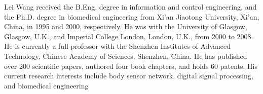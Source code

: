 \documentclass[journal]{IEEEtran}
\begin{document}
\begin{IEEEbiography}{Lei Wang}
received the B.Eng. degree in information and control engineering, and the Ph.D. degree in biomedical engineering from Xi’an Jiaotong University, Xi’an, China, in 1995 and 2000, respectively. He was with the University of Glasgow, Glasgow, U.K., and Imperial College London, London, U.K., from 2000 to 2008. He is currently a full professor with the Shenzhen Institutes of Advanced Technology, Chinese Academy of Sciences, Shenzhen, China. He has published over 200 scientific papers, authored four book chapters, and holds 60 patents. His current research interests include body sensor network, digital signal processing, and biomedical engineering
\end{IEEEbiography}











\end{document}
